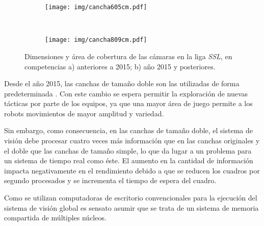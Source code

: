 \begin{figure}[!htb]

	\centering

	\begin{subfigure}[!htb]{0.45\textwidth}
		\centering
		\texttt{[image: img/cancha605cm.pdf]}
		\caption{}
	\end{subfigure}
	~
	\begin{subfigure}[!htb]{0.45\textwidth}
		\centering
		\texttt{[image: img/cancha809cm.pdf]}
		\caption{}
	\end{subfigure}

	\caption{Dimensiones y área de cobertura de las cámaras en la liga
	\emph{SSL}, en competencias a) anteriores a 2015; b) año 2015 y
	posteriores.}

	\label{cancha}

\end{figure}

Desde el año 2015, las canchas de tamaño doble son las utilizadas de forma
predeterminada \cite{sslrules2015}. Con este cambio se espera permitir la
exploración de nuevas tácticas por parte de los equipos, ya que una mayor área
de juego permite a los robots movimientos de mayor amplitud y variedad.

Sin embargo, como consecuencia, en las canchas de tamaño doble, el sistema de
visión debe procesar cuatro veces más información que en las canchas
originales y el doble que las canchas de tamaño simple, lo que da lugar a un
problema para un sistema de tiempo real como éste. El aumento en la cantidad de
información impacta negativamente en el rendimiento debido a que se reducen los
cuadros por segundo procesados y se incrementa el tiempo de espera del cuadro.

Como se utilizan computadoras de escritorio convencionales para la ejecución
del sistema de visión global es sensato asumir que se trata de un sistema de
memoria compartida de múltiples núcleos.
